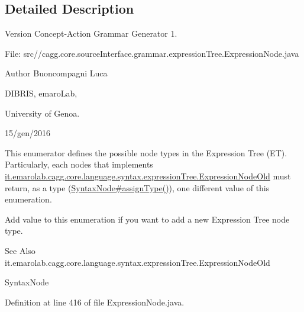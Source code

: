 \subsection{Detailed Description}
\begin{DoxyVersion}{Version}
Concept-\/\-Action Grammar Generator 1. \par
 File\-: src//cagg.core.\-source\-Interface.\-grammar.\-expression\-Tree.\-Expression\-Node.\-java \par

\end{DoxyVersion}
\begin{DoxyAuthor}{Author}
Buoncompagni Luca \par
 D\-I\-B\-R\-I\-S, emaro\-Lab,\par
 University of Genoa. \par
 15/gen/2016 \par

\end{DoxyAuthor}


This enumerator defines the possible node types in the Expression Tree (E\-T). Particularly, each nodes that implements \hyperlink{}{it.\-emarolab.\-cagg.\-core.\-language.\-syntax.\-expression\-Tree.\-Expression\-Node\-Old} must return, as a type (\hyperlink{}{Syntax\-Node\#assign\-Type()}), one different value of this enumeration.\par
 Add value to this enumeration if you want to add a new Expression Tree node type. 

\begin{DoxySeeAlso}{See Also}
it.\-emarolab.\-cagg.\-core.\-language.\-syntax.\-expression\-Tree.\-Expression\-Node\-Old 

Syntax\-Node 
\end{DoxySeeAlso}


Definition at line 416 of file Expression\-Node.\-java.



